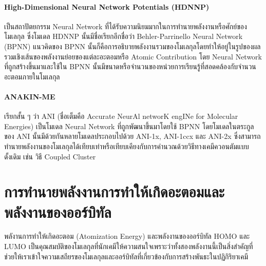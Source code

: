 \paragraph{High-Dimensional Neural Network Potentials (HDNNP)}\autocite{behler2007} เป็นสถาปัตยกรรม Neural Network ที่ได้รับความนิยมมากในการทำนายพลังงานหรือศักย์ของโมเลกุล ซึ่งโมเดล HDNNP นั้นมีชื่อเรียกอีกชื่อว่า Behler-Parrinello Neural Network (BPNN) แนวคิดของ BPNN นั้นก็คือการอธิบายพลังงานรวมของโมเลกุลโดยทำให้อยู่ในรูปของผลรวมเชิงเส้นของพลังงานย่อยของแต่ละอะตอมหรือ Atomic Contribution โดย Neural Network ที่ถูกสร้างขึ้นมาและใช้ใน BPNN นั้นมีขนาดหรือจำนวนของหน่วยการเรียนรู้ที่สอดคล้องกับจำนวนอะตอมภายในโมเลกุล

\paragraph{ANAKIN-ME} เรียกสั้น ๆ ว่า ANI (ชื่อเต็มคือ Accurate NeurAl networK engINe for Molecular Energies) เป็นโมเดล Neural Network ที่ถูกพัฒนาขึ้นมาโดยใช้ BPNN โดยโมเดลในตระกูลของ ANI นั้นมีด้วยกันหลายโมเดลประกอบไปด้วย ANI-1x\autocite{smith2017}, ANI-1ccx\autocite{smith2018} และ ANI-2x\autocite{smith2019,devereux2020} ซึ่งสามารถทำนายพลังงานของโมเลกุลได้เทียบเท่าหรือเทียบเคียงกับการคำนวณด้วยวิธีทางเคมีควอนตัมแบบดั้งเดิม เช่น วิธี Coupled Cluster

\section{การทำนายพลังงานการทำให้เกิดอะตอมและพลังงานของออร์บิทัล}
\label{sec:pred_ener_atom_orb}

พลังานการทำให้เกิดอะตอม (Atomization Energy) และพลังงานของออร์บิทัล HOMO และ LUMO เป็นคุณสมบัติของโมเลกุลที่นักเคมีให้ความสนใจเพราะว่าทั้งสองพลังงานนี้เป็นสิ่งสำคัญที่ช่วยให้เราเข้าใจความเสถียรของโมเลกุลและออร์บิทัลที่เกี่ยวข้องกับการสร้างพันธะในปฏิกิริยาเคมี

